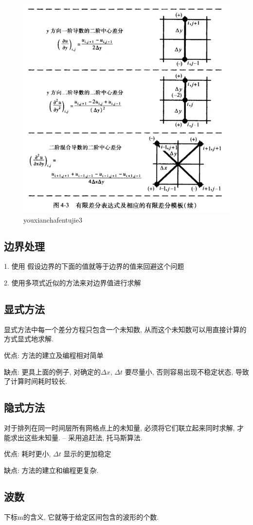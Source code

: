 \documentclass[UTF8]{ctexart}
\begin{document}
\begin{figure}
	\centering
	\includegraphics[width=0.7\linewidth]{figures/youxianchafentujie3.png}
	\caption{youxianchafentujie3}
	\label{fig:youxianchafentujie3}
\end{figure}


\subsection{边界处理}
1. 使用 假设边界的下面的值就等于边界的值来回避这个问题

2. 使用多项式近似的方法来对边界值进行求解

\subsection{显式方法}
显式方法中每一个差分方程只包含一个未知数, 从而这个未知数可以用直接计算的方式显式地求解.

优点: 方法的建立及编程相对简单

缺点: 更具上面的例子, 对确定的$\Delta  x$,  $\Delta t$ 要尽量小, 否则容易出现不稳定状态, 导致了计算时间耗时较长.
\subsection{隐式方法}
对于排列在同一时间层所有网格点上的未知量, 必须将它们联立起来同时求解, 才能求出这些未知量. -- 采用追赶法, 托马斯算法.

优点: 耗时更小, $\Delta t$ 显示的更加稳定

缺点: 方法的建立和编程更复杂.

\subsection{波数}
下标m的含义, 它就等于给定区间包含的波形的个数.
\end{document}
